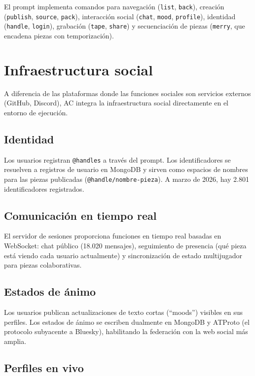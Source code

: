 \documentclass[10pt,letterpaper,twocolumn]{article}
\begin{document}
El prompt implementa comandos para navegación (\texttt{list}, \texttt{back}), creación (\texttt{publish}, \texttt{source}, \texttt{pack}), interacción social (\texttt{chat}, \texttt{mood}, \texttt{profile}), identidad (\texttt{handle}, \texttt{login}), grabación (\texttt{tape}, \texttt{share}) y secuenciación de piezas (\texttt{merry}, que encadena piezas con temporización).


\section{Infraestructura social}
\label{sec:social}

A diferencia de las plataformas donde las funciones sociales son servicios externos (GitHub, Discord), AC integra la infraestructura social directamente en el entorno de ejecución.

\subsection{Identidad}

Los usuarios registran \texttt{@handles} a través del prompt. Los identificadores se resuelven a registros de usuario en MongoDB y sirven como espacios de nombres para las piezas publicadas (\texttt{@handle/nombre-pieza}). A marzo de 2026, hay 2.801 identificadores registrados.

\subsection{Comunicación en tiempo real}

El servidor de sesiones proporciona funciones en tiempo real basadas en WebSocket: chat público (18.020 mensajes), seguimiento de presencia (qué pieza está viendo cada usuario actualmente) y sincronización de estado multijugador para piezas colaborativas.

\subsection{Estados de ánimo}

Los usuarios publican actualizaciones de texto cortas (``moods'') visibles en sus perfiles. Los estados de ánimo se escriben dualmente en MongoDB y ATProto (el protocolo subyacente a Bluesky), habilitando la federación con la web social más amplia.

\subsection{Perfiles en vivo}
\end{document}
